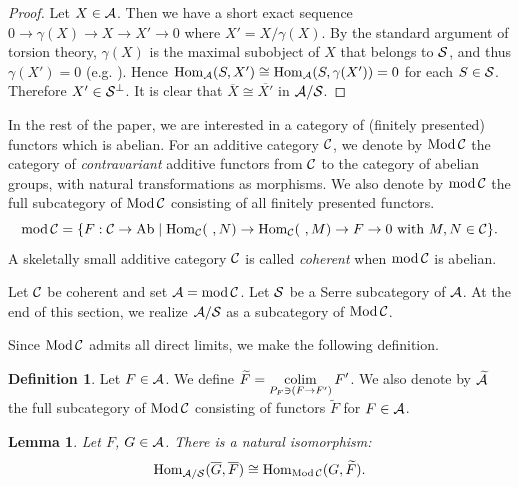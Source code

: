 \documentclass[11pt]{amsart}
\newtheorem{lemma}[theorem]{Lemma}
\theoremstyle{definition}
\newtheorem{definition}[theorem]{Definition}
\numberwithin{equation}{section}
\begin{document}
\begin{proof}
Let $X \in \AA$. 
Then we have a short exact sequence $0 \to \gamma (X) \to X \to X' \to 0$ where $X' = X / \gamma (X)$. 
By the standard argument of torsion theory, $\gamma (X)$ is the maximal subobject of $X$ that belongs to $\SS$, and thus $\gamma (X') = 0$ (e.g. \cite[Lemma 2.1]{Kr97}). 
Hence $\HomA (S, X') \cong \HomA (S, \gamma (X')) = 0$ for each $S \in \SS$. 
Therefore $X' \in \SS ^{\perp}$. 
It is clear that $\overline{X} \cong \overline{X'}$ in $\AA/ \SS$. 
\end{proof}

In the rest of the paper, we are interested in a category of (finitely presented) functors which is abelian. 
For an additive category $\CC$, we denote by $\ModCC$ the category of {\it contravariant} additive functors from $\CC$ to the category of abelian groups, with natural transformations as morphisms. 
We also denote by $\modCC$ the full subcategory of $\ModCC$ consisting of all finitely presented functors. 
$$
\modCC  = \{ F : \CC \to \mathrm{Ab} \mid \Hom _\CC (\  , N) \to \Hom _\CC (\  , M) \to F \to 0 \ \text{with $M, N \in \CC$} \}.
$$
A skeletally small additive category $\CC$ is called {\it coherent} when $\modCC$ is abelian. 

Let $\CC$ be coherent and set $\AA = \modCC$. 
Let $\SS$ be a Serre subcategory of $\AA$. 
At the end of this section, we realize $\AA/\SS$ as a subcategory of $\ModCC$. 

Since $\ModCC$ admits all direct limits, we make the following definition.   

\begin{definition}\label{A9}
Let $F \in \AA$. 
We define $\displaystyle \widetilde{F} = \colim_{P_F \ni (F \to F')} F'$. 
We also denote by $\widetilde{\AA }$ the full subcategory of $\ModCC$ consisting of functors $\widetilde{F}$ for $F \in \AA$. 
\end{definition}


\begin{lemma}\label{A6}
Let $F$, $G \in \AA$. 
There is a natural isomorphism: $$\Hom_{\AA /  \SS } ( \overline{G}, \overline{F}) \cong \Hom_{\ModCC} (G, \widetilde{F}).$$ 
\end{lemma}
\end{document}
